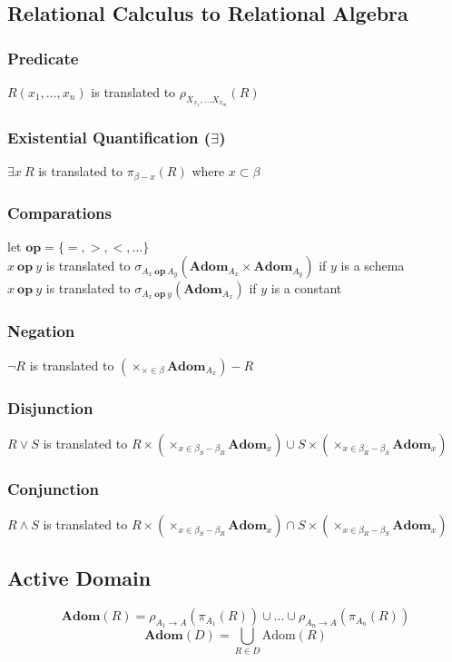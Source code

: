 \documentclass{article}
\begin{document}
\subsection{Relational Calculus to Relational Algebra}
\subsubsection*{Predicate}
$R(x_1, ... ,x_n)$ is translated to $\rho_{X_{x_1}, ... X_{x_m}}(R)$

\subsubsection*{Existential Quantification ($\exists$)}
$\exists x \: R$ is translated to $\pi_{\beta - x}(R)$ where $x \subset \beta$

\subsubsection*{Comparations}
let $\mathbf{op} = \{=,>,<,...\}$\\
$x \:\mathbf{op}\: y$ is translated to $\sigma_{A_x \:\mathbf{op}\: A_y} (\mathbf{Adom}_{A_x}\times\mathbf{Adom}_{A_y})$ if $y$ is a schema\\
$x \:\mathbf{op}\: y$ is translated to $\sigma_{A_x \:\mathbf{op}\: y} (\mathbf{Adom}_{A_x})$ if $y$ is a constant

\subsubsection*{Negation}
$\neg R$ is translated to $(\times_{\times \in \beta} \mathbf{Adom}_{A_x}) - R$

\subsubsection*{Disjunction}
$R \vee S$ is translated to $R \times (\times_{x \in \beta_S - \beta_R} \textbf{Adom}_x) \cup S \times (\times_{x \in \beta_R - \beta_S} \textbf{Adom}_x)$

\subsubsection*{Conjunction}
$R \wedge S$ is translated to $R \times (\times_{x \in \beta_S - \beta_R} \textbf{Adom}_x) \cap S \times (\times_{x \in \beta_R - \beta_S} \textbf{Adom}_x)$

\subsection{Active Domain}
$$\textbf{Adom}(R) = \rho_{A_1\rightarrow A}(\pi_{A_1}(R))\cup ... \cup \rho_{A_n\rightarrow A}(\pi_{A_n}(R))$$
$$\textbf{Adom}(D) = \bigcup_{R\in D}\text{Adom}(R)$$
\end{document}
